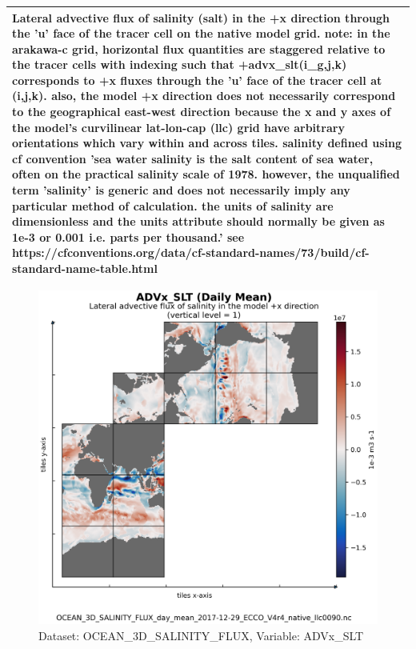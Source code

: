 \begin{longtable}{|m{}|m{}|m{}|m{}|}
\multicolumn{4}{|p{1\textwidth}|}{\footnotesize{{Lateral advective flux of salinity (salt) in the +x direction through the 'u' face of the tracer cell on the native model grid. note: in the arakawa-c grid, horizontal flux quantities are staggered relative to the tracer cells with indexing such that +advx\_slt(i\_g,j,k) corresponds to +x fluxes through the 'u' face of the tracer cell at (i,j,k). also, the model +x direction does not necessarily correspond to the geographical east-west direction because the x and y axes of the model's curvilinear lat-lon-cap (llc) grid have arbitrary orientations which vary within and across tiles. salinity defined using cf convention 'sea water salinity is the salt content of sea water, often on the practical salinity scale of 1978. however, the unqualified term 'salinity' is generic and does not necessarily imply any particular method of calculation. the units of salinity are dimensionless and the units attribute should normally be given as 1e-3 or 0.001 i.e. parts per thousand.' see https://cfconventions.org/data/cf-standard-names/73/build/cf-standard-name-table.html}}} \\ \hline
\end{longtable}

\begin{figure}[H]
\centering
\includegraphics[scale=0.55]{../images/plots/native_plots/Ocean_Three-Dimensional_Salinity_Fluxes/ADVx_SLT.png}
\caption{Dataset: OCEAN\_3D\_SALINITY\_FLUX, Variable: ADVx\_SLT}
\label{tab:table-OCEAN_3D_SALINITY_FLUX_ADVx_SLT-Plot}
\end{figure}
\newpage
\pagebreak
